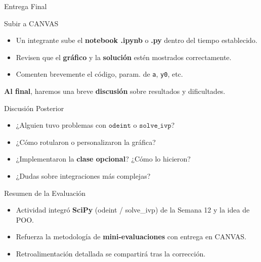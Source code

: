 \documentclass[10pt]{beamer}
\begin{document}
\begin{frame}{Entrega Final}
  \begin{block}{Subir a CANVAS}
    \begin{itemize}
      \item Un integrante sube el \textbf{notebook .ipynb} o \textbf{.py} dentro del tiempo establecido.
      \item Revisen que el \textbf{gráfico} y la \textbf{solución} estén mostrados correctamente.
      \item Comenten brevemente el código, param. de \texttt{a}, \texttt{y0}, etc.
    \end{itemize}
  \end{block}
  \vspace{0.3cm}
  \textbf{Al final}, haremos una breve \textbf{discusión} sobre resultados y dificultades.
\end{frame}

\begin{frame}{Discusión Posterior}
  \begin{itemize}
    \item ¿Alguien tuvo problemas con \(\texttt{odeint}\) o \(\texttt{solve\_ivp}\)?
    \item ¿Cómo rotularon o personalizaron la gráfica?
    \item ¿Implementaron la \textbf{clase opcional}? ¿Cómo lo hicieron?
    \item ¿Dudas sobre integraciones más complejas?
  \end{itemize}
\end{frame}

\begin{frame}{Resumen de la Evaluación}
  \begin{itemize}
    \item Actividad integró \textbf{SciPy} (odeint / solve\_ivp) de la Semana 12 y la idea de POO.
    \item Refuerza la metodología de \textbf{mini-evaluaciones} con entrega en CANVAS.
    \item Retroalimentación detallada se compartirá tras la corrección.
  \end{itemize}
\end{frame}
\end{document}
